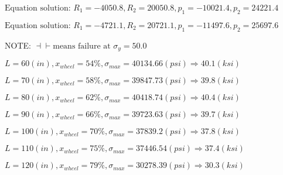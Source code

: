 \documentclass[11pt]{article}
\newcommand{\prompt}[4]{
        {\ttfamily\llap{{\color{#2}[#3]:\hspace{3pt}#4}}\vspace{-\baselineskip}}
    }
\begin{document}
    
 
            
\prompt{Out}{outcolor}{12}{}
    
    $\text{Equation solution: } R_1=-4050.8,R_2=20050.8, p_1=-10021.4, p_2=24221.4$

    
 
            
\prompt{Out}{outcolor}{12}{}
    
    $\text{Equation solution: } R_1=-4721.1,R_2=20721.1, p_1=-11497.6, p_2=25697.6$

    
 
            
\prompt{Out}{outcolor}{12}{}
    
    NOTE: $\dashv \vdash \text{means failure at } \sigma_y=50.0$

    
 
            
\prompt{Out}{outcolor}{12}{}
    
    $L= 60(in), x_{wheel}=54 \%, \sigma_{max}=40134.66(psi) \Rightarrow 40.1(ksi)$

    
 
            
\prompt{Out}{outcolor}{12}{}
    
    $L= 70(in), x_{wheel}=58 \%, \sigma_{max}=39847.73(psi) \Rightarrow 39.8(ksi)$

    
 
            
\prompt{Out}{outcolor}{12}{}
    
    $L= 80(in), x_{wheel}=62 \%, \sigma_{max}=40418.74(psi) \Rightarrow 40.4(ksi)$

    
 
            
\prompt{Out}{outcolor}{12}{}
    
    $L= 90(in), x_{wheel}=66 \%, \sigma_{max}=39723.63(psi) \Rightarrow 39.7(ksi)$

    
 
            
\prompt{Out}{outcolor}{12}{}
    
    $L= 100(in), x_{wheel}=70 \%, \sigma_{max}=37839.2(psi) \Rightarrow 37.8(ksi)$

    
 
            
\prompt{Out}{outcolor}{12}{}
    
    $L= 110(in), x_{wheel}=75 \%, \sigma_{max}=37446.54(psi) \Rightarrow 37.4(ksi)$

    
 
            
\prompt{Out}{outcolor}{12}{}
    
    $L= 120(in), x_{wheel}=79 \%, \sigma_{max}=30278.39(psi) \Rightarrow 30.3(ksi)$

    
 
\end{document}

